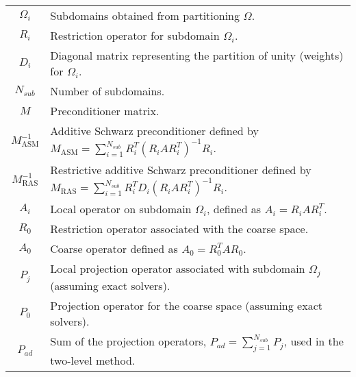 \begin{longtable}{c p{10cm}}
    $\Omega_i$            & Subdomains obtained from partitioning $\Omega$.                                                                                  \\
    $R_i$                 & Restriction operator for subdomain $\Omega_i$.                                                                                   \\
    $D_i$                 & Diagonal matrix representing the partition of unity (weights) for $\Omega_i$.                                                    \\
    $N_{sub}$             & Number of subdomains.                                                                                                            \\
    $M$                   & Preconditioner matrix.                                                                                                           \\
    $M^{-1}_{\text{ASM}}$ & Additive Schwarz preconditioner defined by $M_{\text{ASM}} = \sum_{i=1}^{N_{sub}} R_i^T (R_i A R_i^T)^{-1} R_i$.                 \\
    $M^{-1}_{\text{RAS}}$ & Restrictive additive Schwarz preconditioner defined by $M_{\text{RAS}} = \sum_{i=1}^{N_{sub}} R_i^T D_i (R_i A R_i^T)^{-1} R_i$. \\
    $A_i$                 & Local operator on subdomain $\Omega_i$, defined as $A_i = R_i A R_i^T$.                                                          \\
    $R_0$                 & Restriction operator associated with the coarse space.                                                                           \\
    $A_0$                 & Coarse operator defined as $A_0 = R_0^T A R_0$.                                                                                  \\
    $P_j$                 & Local projection operator associated with subdomain $\Omega_j$ (assuming exact solvers).                                                                  \\
    $P_0$                 & Projection operator for the coarse space (assuming exact solvers).                                                                                        \\
    $P_{ad}$              & Sum of the projection operators, $P_{ad} = \sum_{j=1}^{N_{sub}} P_j$, used in the two-level method.                              \\

\end{longtable}

